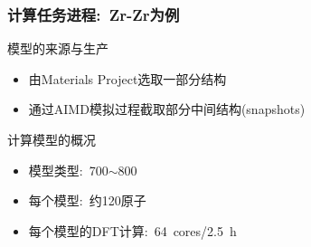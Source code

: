 %
\begin{frame}
	\frametitle{计算任务进程:~\textrm{Zr-Zr}为例}
	模型的来源与生产
	\begin{itemize}
		\item 由\textrm{Materials Project}选取一部分结构
		\item 通过\textrm{AIMD}模拟过程截取部分中间结构\textrm{(snapshots)}
	\end{itemize}
	计算模型的概况
	\begin{itemize}
		\item 模型类型:~\textrm{700$\sim$800}
		\item 每个模型:~约\textrm{120}原子
		\item 每个模型的\textrm{DFT}计算:~\textrm{64~cores}/\textrm{2.5~h}
	\end{itemize}
\end{frame}

